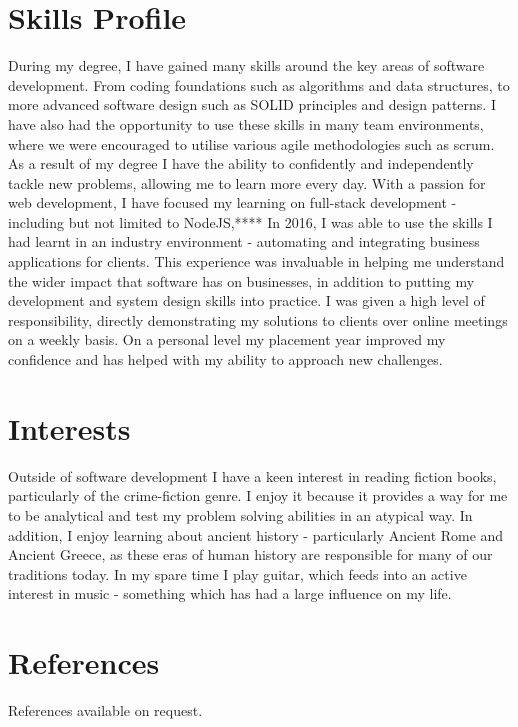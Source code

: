 \documentclass[1pt]{article}
\begin{document}
\section*{Skills Profile}
During my degree, I have gained many skills around the key areas of software development. From coding foundations such as algorithms and data structures, to more advanced software design such as SOLID principles and design patterns. I have also had the opportunity to use these skills in many team environments, where we were encouraged to utilise various agile methodologies such as scrum. As a result of my degree I have the ability to confidently and independently tackle new problems, allowing me to learn more every day. With a passion for web development, I have focused my learning on full-stack development - including but not limited to NodeJS,****  \newline \newline In 2016, I was able to use the skills I had learnt in an industry environment - automating and integrating business applications for clients. This experience was invaluable in helping me understand the wider impact that software has on businesses, in addition to putting my development and system design skills into practice. I was given a high level of responsibility, directly demonstrating my solutions to clients over online meetings on a weekly basis. On a personal level my placement year improved my confidence and has helped with my ability to approach new challenges.

\section*{Interests}
Outside of software development I have a keen interest in reading fiction books, particularly of the crime-fiction genre. I enjoy it because it provides a way for me to be analytical and test my problem solving abilities in an atypical way. In addition, I enjoy learning about ancient history - particularly Ancient Rome and Ancient Greece, as these eras of human history are responsible for many of our traditions today. In my spare time I play guitar, which feeds into an active interest in music - something which has had a large influence on my life.


\section*{References}
References available on request.
\end{document}
